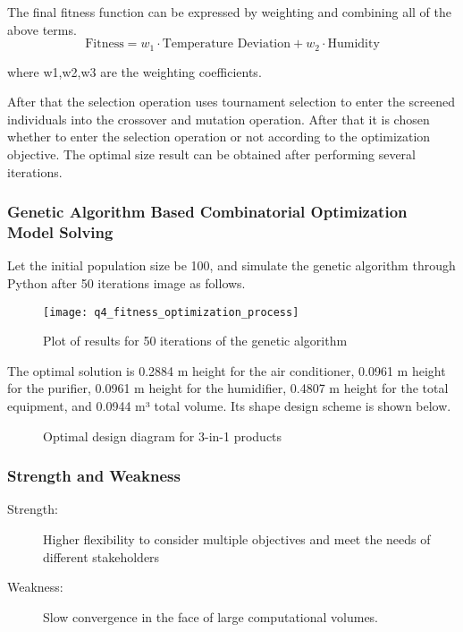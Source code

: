 \documentclass{apmcmthesis}
\begin{document}
The final fitness function can be expressed by weighting and combining all of the above terms.
\begin{equation}
	\text{Fitness} = w_1 \cdot \text{Temperature Deviation} + w_2 \cdot \text{Humidity}
\end{equation}

where w1,w2,w3 are the weighting coefficients.

After that the selection operation uses tournament selection to enter the screened individuals into the crossover and mutation operation. After that it is chosen whether to enter the selection operation or not according to the optimization objective. The optimal size result can be obtained after performing several iterations.

\subsubsection{Genetic Algorithm Based Combinatorial Optimization Model Solving}
Let the initial population size be 100, and simulate the genetic algorithm through Python after 50 iterations image as follows.

\begin{figure}[H]
	\centering
	\texttt{[image: q4\_fitness\_optimization\_process]}%
	\caption{Plot of results for 50 iterations of the genetic algorithm} %
\end{figure}

The optimal solution is 0.2884 m height for the air conditioner, 0.0961 m height for the purifier, 0.0961 m height for the humidifier, 0.4807 m height for the total equipment, and 0.0944 m³ total volume. Its shape design scheme is shown below.
\begin{figure}[H]
	\centering    
	\caption{Optimal design diagram for 3-in-1 products}		%
\end{figure}

\subsubsection{Strength and Weakness}

\begin{description}
	\item[Strength:]  Higher flexibility to consider multiple objectives and meet the needs of different stakeholders
	\item[Weakness:]  Slow convergence in the face of large computational volumes.
\end{description}
\end{document}
